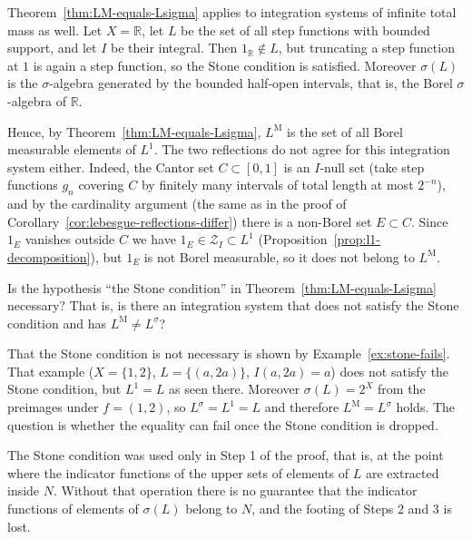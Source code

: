 \begin{example}\label{ex:step-functions-R}
  Theorem~\ref{thm:LM-equals-Lsigma} applies to integration systems of infinite
  total mass as well.
  Let $X=\mathbb{R}$, let $L$ be the set of all step functions with bounded
  support, and let $I$ be their integral.
  Then $1_{\mathbb{R}}\notin L$, but truncating a step function at $1$ is again
  a step function, so the Stone condition is satisfied.
  Moreover $\sigma(L)$ is the $\sigma$-algebra generated by the bounded
  half-open intervals, that is, the Borel $\sigma$-algebra of $\mathbb{R}$.

  Hence, by Theorem~\ref{thm:LM-equals-Lsigma}, $L^{\mathrm{M}}$ is the set of
  all Borel measurable elements of $L^1$.
  The two reflections do not agree for this integration system either.
  Indeed, the Cantor set $C\subset[0,1]$ is an $I$-null set (take step functions
  $g_n$ covering $C$ by finitely many intervals of total length at most
  $2^{-n}$), and by the cardinality argument (the same as in the proof of
  Corollary~\ref{cor:lebesgue-reflections-differ}) there is a non-Borel set
  $E\subset C$.
  Since $1_E$ vanishes outside $C$ we have
  $1_E\in\mathcal{Z}_I\subset L^1$
  (Proposition~\ref{prop:l1-decomposition}), but $1_E$ is not Borel measurable,
  so it does not belong to $L^{\mathrm{M}}$.
\end{example}

\begin{problem}\label{prob:when-reflections-coincide}
  Is the hypothesis ``the Stone condition'' in
  Theorem~\ref{thm:LM-equals-Lsigma} necessary?
  That is, is there an integration system that does not satisfy the Stone
  condition and has $L^{\mathrm{M}}\ne L^{\sigma}$?
\end{problem}

\noindent
That the Stone condition is not necessary is shown by
Example~\ref{ex:stone-fails}.
That example ($X=\{1,2\}$, $L=\{(a,2a)\}$, $I(a,2a)=a$) does not satisfy the
Stone condition, but $L^1=L$ as seen there.
Moreover $\sigma(L)=2^X$ from the preimages under $f=(1,2)$, so
$L^{\sigma}=L^1=L$ and therefore $L^{\mathrm{M}}=L^{\sigma}$ holds.
The question is whether the equality can fail once the Stone condition is
dropped.

The Stone condition was used only in Step 1 of the proof, that is, at the point
where the indicator functions of the upper sets of elements of $L$ are extracted
inside $N$.
Without that operation there is no guarantee that the indicator functions of
elements of $\sigma(L)$ belong to $N$, and the footing of Steps 2 and 3 is lost.
